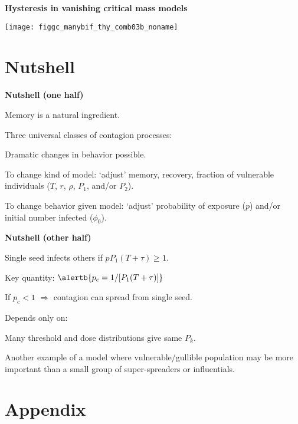   \textbf{Hysteresis in vanishing critical mass models}

  \centering
  \texttt{[image: figgc\_manybif\_thy\_comb03b\_noname]}


\section{Nutshell}

  \textbf{Nutshell (one half)}

  
   
    Memory is a natural ingredient. %
  
    Three universal classes of contagion processes:
    
     
     
     
    
  
    Dramatic changes in behavior possible.
  
    To change kind of model: `adjust' memory, recovery, fraction
    of vulnerable individuals ($T$, $r$, $\rho$, $P_1$, and/or $P_2$).
  
    To change behavior given model: `adjust' probability
    of exposure ($p$) and/or initial number infected ($\phi_0$).
  

  \textbf{Nutshell (other half)}

  
   
    Single seed infects others if $p P_1 (T + \tau) \ge 1$.
   
    Key quantity: $\alertb{p_c = 1/[P_1 (T + \tau)]}$
   
    If $p_c < 1$ $\Rightarrow$ contagion can spread from single seed.
  
    Depends only on:
    
     
     
    
  
    Many threshold and dose distributions give same $P_k$.
  
    Another example of a model where
    vulnerable/gullible population may be more important than
    a small group of super-spreaders or influentials.
  


\section{Appendix}

